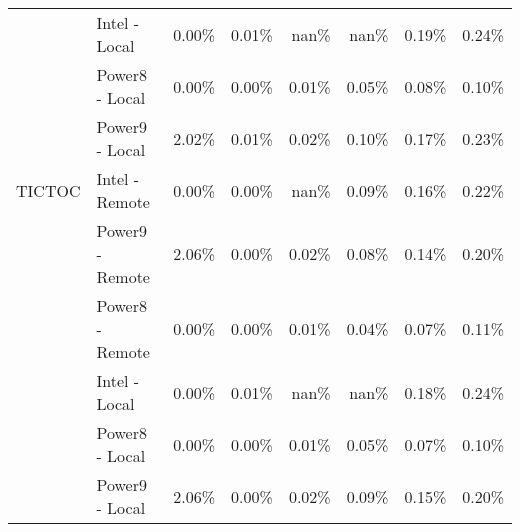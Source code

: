 \begin{tabular}{llrrrrrr}
       & Intel - Local &  0.00\% &  0.01\% &   nan\% &   nan\% &  0.19\% &  0.24\% \\
       & Power8 - Local &  0.00\% &  0.00\% &  0.01\% &  0.05\% &  0.08\% &  0.10\% \\
       & Power9 - Local &  2.02\% &  0.01\% &  0.02\% &  0.10\% &  0.17\% &  0.23\% \\
TICTOC & Intel - Remote &  0.00\% &  0.00\% &   nan\% &  0.09\% &  0.16\% &  0.22\% \\
       & Power9 - Remote &  2.06\% &  0.00\% &  0.02\% &  0.08\% &  0.14\% &  0.20\% \\
       & Power8 - Remote &  0.00\% &  0.00\% &  0.01\% &  0.04\% &  0.07\% &  0.11\% \\
       & Intel - Local &  0.00\% &  0.01\% &   nan\% &   nan\% &  0.18\% &  0.24\% \\
       & Power8 - Local &  0.00\% &  0.00\% &  0.01\% &  0.05\% &  0.07\% &  0.10\% \\
       & Power9 - Local &  2.06\% &  0.00\% &  0.02\% &  0.09\% &  0.15\% &  0.20\% \\
\bottomrule
\end{tabular}

